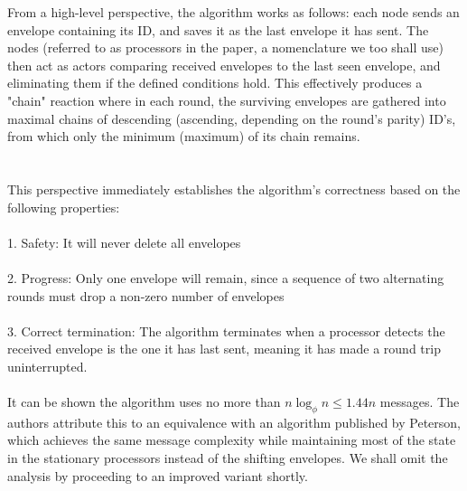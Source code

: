 \documentclass{article}
\begin{document}
From a high-level perspective, the algorithm works as follows: each node sends an envelope containing its ID, and saves it as the last envelope it has sent. The nodes (referred to as processors in the paper, a nomenclature we too shall use) then act as actors comparing received envelopes to the last seen envelope, and eliminating them if the defined conditions hold. This effectively produces a "chain" reaction where in each round, the surviving envelopes are gathered into maximal chains of descending (ascending, depending on the round's parity) ID's, from which only the minimum (maximum) of its chain remains.
\\\\\\
\newpage
This perspective immediately establishes the algorithm's correctness based on the following properties:
\\\\
1. Safety: It will never delete all envelopes \\
\\
2. Progress: Only one envelope will remain, since a sequence of two alternating rounds must drop a non-zero number of envelopes \\
\\
3. Correct termination: The algorithm terminates when a processor detects the received envelope is the one it has last sent, meaning it has made a round trip uninterrupted. \\
\\
It can be shown the algorithm uses no more than $n\log_{\phi}{n} \leq 1.44n$ messages. The authors attribute this to an equivalence with an algorithm published by Peterson, which achieves the same message complexity while maintaining most of the state in the stationary processors instead of the shifting envelopes. We shall omit the analysis by proceeding to an improved variant shortly.
\end{document}
